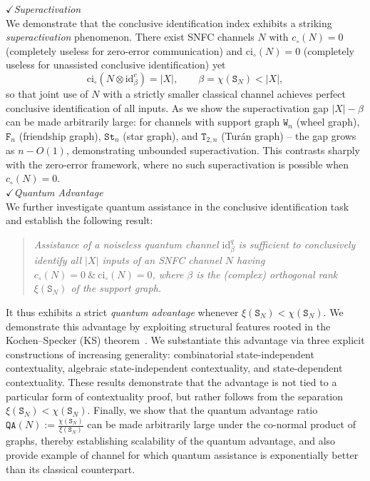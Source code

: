 \documentclass[12pt,a4paper]{article}
\begin{document}
\noindent$\checkmark${\it Superactivation}\vspace{-.3cm}\\

\noindent We demonstrate that the conclusive identification index exhibits a striking \emph{superactivation} phenomenon. There exist SNFC channels $N$ with $c_\circ(N) = 0$ (completely useless for zero-error communication) and $\mathrm{ci}_\circ(N) = 0$ (completely useless for unassisted conclusive identification) yet 
\begin{equation*}
\mathrm{ci}_\circ(N \otimes \mathrm{id}^c_\beta) = |X|, \qquad \beta = \chi(\mathtt{S}_N) < |X|,
\end{equation*}
so that joint use of $N$ with a strictly smaller classical channel achieves perfect conclusive identification of all inputs. As we show the superactivation gap $|X| - \beta$ can be made arbitrarily large: for channels with support graph $\mathtt{W}_n$ (wheel graph), $\mathtt{F}_n$ (friendship graph), $\mathtt{St}_n$ (star graph), and $\mathtt{T}_{2,n}$ (Turán graph) -- the gap grows as $n - O(1)$, demonstrating unbounded superactivation. This contrasts sharply with the zero-error framework, where no such superactivation is possible when $c_\circ(N) = 0$.\\

\noindent$\checkmark${\it Quantum Advantage}\vspace{-.3cm}\\

\noindent We further investigate quantum assistance in the conclusive identification task and establish the following result:
\begin{quote}
\emph{Assistance of a noiseless quantum channel $\mathrm{id}^q_\beta$ is sufficient to conclusively identify all $|X|$ inputs of an SNFC channel $N$ having $c_\circ(N)=0~\&~\mathrm{ci}_\circ(N)=0$, where $\beta$ is the (complex) orthogonal rank $\xi(\mathtt{S}_N)$ of the support graph.}
\end{quote}
It thus exhibits a strict \emph{quantum advantage} whenever $\xi(\mathtt{S}_N) < \chi(\mathtt{S}_N)$. We demonstrate this advantage by exploiting structural features rooted in the Kochen--Specker (KS) theorem~\cite{Kochen1967}. We substantiate this advantage via three explicit constructions of increasing generality: combinatorial state-independent contextuality, algebraic state-independent contextuality, and state-dependent contextuality. These results demonstrate that the advantage is not tied to a particular form of contextuality proof, but rather follows from the separation $\xi(\mathtt{S}_N) < \chi(\mathtt{S}_N)$. Finally, we show that the quantum advantage ratio $\mathtt{QA}(N) := \frac{\chi(\mathtt{S}_N)}{\xi(\mathtt{S}_N)}$ can be made arbitrarily large under the co-normal product of graphs, thereby establishing scalability of the quantum advantage, and also provide example of channel for which quantum assistance is exponentially better than its classical counterpart. \vspace{-.25cm}\\
\end{document}
